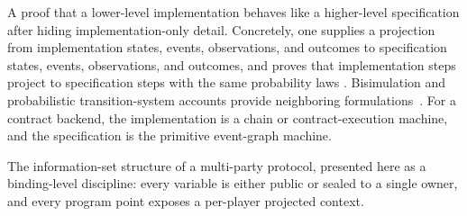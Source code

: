 \begin{description}[itemsep=0pt,leftmargin=1.2em,style=nextline]
  A proof that a lower-level implementation behaves like a higher-level
  specification after hiding implementation-only detail.  Concretely,
  one supplies a projection from implementation states, events,
  observations, and outcomes to specification states, events,
  observations, and outcomes, and proves that implementation steps
  project to specification steps with the same probability laws
  \citep{LynchVaandrager1995,AbadiLamport1991}.  Bisimulation and
  probabilistic transition-system accounts provide neighboring
  formulations~\citep{Park1981Bisimulation,Milner1989Bisimulation,
  Segala1995Probabilistic}.  For a contract backend, the implementation
  is a chain or contract-execution machine, and the specification is the
  primitive event-graph machine.
\item[Visibility / view.]
  The information-set structure of a multi-party protocol, presented
  here as a binding-level discipline: every variable is either public
  or sealed to a single owner, and every program point exposes a
  per-player projected context.
\end{description}
